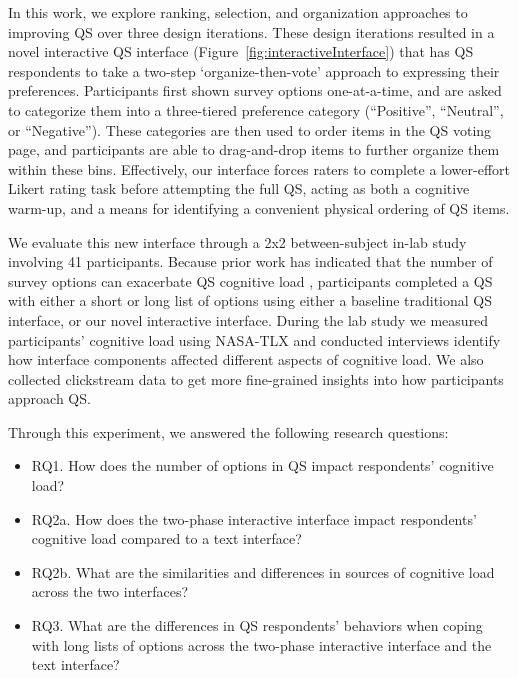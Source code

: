 In this work, we explore ranking, selection, and organization approaches to improving QS over three design iterations. These design iterations resulted in a novel interactive QS interface (Figure~\ref{fig:interactiveInterface}) that has QS respondents to take a two-step `organize-then-vote' approach to expressing their preferences. Participants first shown survey options one-at-a-time, and are asked to categorize them into a three-tiered preference category (``Positive'', ``Neutral'', or ``Negative''). These categories are then used to order items in the QS voting page, and participants are able to drag-and-drop items to further organize them within these bins. Effectively, our interface forces raters to complete a lower-effort Likert rating task before attempting the full QS, acting as both a cognitive warm-up, and a means for identifying a convenient physical ordering of QS items.

We evaluate this new interface through a 2x2 between-subject in-lab study involving 41 participants. Because prior work has indicated that the number of survey options can exacerbate QS cognitive load \cite{lenznerCognitiveBurdenSurvey2010, blessAskingDifficultQuestions1992}, participants completed a QS with either a short or long list of options using either a baseline traditional QS interface, or our novel interactive interface. During the lab study we measured participants' cognitive load using NASA-TLX and conducted interviews identify how interface components affected different aspects of cognitive load. We also collected clickstream data to get more fine-grained insights into how participants approach QS. 

Through this experiment, we answered the following research questions:

\begin{itemize}
    \item RQ1. How does the number of options in QS impact respondents' cognitive load?
    \item RQ2a. How does the two-phase interactive interface impact respondents' cognitive load compared to a text interface?
    \item RQ2b. What are the similarities and differences in sources of cognitive load across the two interfaces?
    \item RQ3. What are the differences in QS respondents' behaviors when coping with long lists of options across the two-phase interactive interface and the text interface?
\end{itemize}



